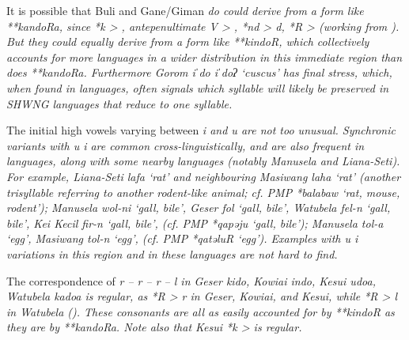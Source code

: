 It is possible that Buli
and Gane/Giman \it{do} could derive from a form like \mbox{**kandoRa},
since *k > {\0},
antepenultimate V > {\0},
*nd > \it{d}, *R > {\0} (working from \citealp{Kamholz2014}).
But they could equally derive from a form like **kindoR,
which collectively accounts for more languages in a wider distribution
in this immediate region than does **kandoRa.
Furthermore Gorom \it{iˈdo {\tl} iˈdoʔ} ‘cuscus’ has
final stress, which, when found in  languages,
often signals which syllable will likely be preserved in SHWNG
languages that reduce to one syllable.

The initial high vowels varying between \it{i}
and \it{u} are not too unusual.
Synchronic variants with \it{u {\tl} i} are common cross-linguistically,
and are also frequent in  languages,
along with some nearby  languages (notably Manusela and Liana-Seti).
For example, Liana-Seti \it{lafa} ‘rat’
and neighbouring Masiwang \it{laha} ‘rat’ (another trisyllable
referring to another rodent-like animal; cf.
PMP *balabaw ‘rat, mouse,
rodent’); Manusela \it{wol-ni} ‘gall,
bile’, Geser \it{fol} ‘gall, bile’,
Watubela \it{fel-n} ‘gall, bile’,
Kei Kecil \it{fir-n} ‘gall, bile’, (cf.
PMP *qapəju ‘gall, bile’); Manusela \it{tol-a} ‘egg’,
Masiwang \it{tol-n} ‘egg’, (cf. PMP *qatəluR ‘egg’).
Examples with \it{u {\tl} i} variations in this region
and in these languages are not hard to find.

The correspondence of \it{r -- r -- r -- l} in Geser \it{kido},
Kowiai \it{indo}, Kesui \it{udoa},
Watubela \it{kadoa} is regular,
as *R > \it{r} in Geser,
Kowiai, and Kesui, while *R > \it{l} in Watubela ().
These consonants are all as easily accounted for by **kindoR
as they are by **kandoRa.
Note also that Kesui *k > {\0} is regular.

